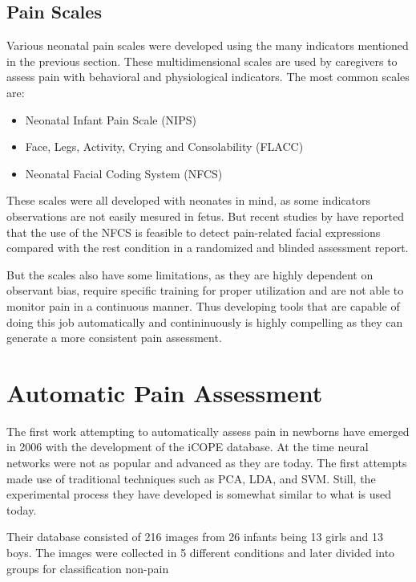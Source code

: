 \subsection{Pain Scales}

Various neonatal pain scales were developed using the many indicators mentioned in the previous section. These multidimensional scales are used by caregivers to assess pain with behavioral and physiological indicators. The most common scales are:

\begin{itemize}
    \item Neonatal Infant Pain Scale (NIPS)
    \item Face, Legs, Activity, Crying and Consolability (FLACC)
    \item Neonatal Facial Coding System (NFCS)
\end{itemize}

These scales were all developed with neonates in mind, as some indicators observations are not easily mesured in fetus. But recent studies by \citeauthor{bernardes2018feasibility} have reported that the use of the NFCS is feasible to detect pain-related facial expressions compared with the rest condition in a randomized and blinded assessment report.

But the scales also have some limitations, as they are highly dependent on observant bias, require specific training for proper utilization and are not able to monitor pain in a continuous manner. Thus developing tools that are capable of doing this job automatically and contininuously is highly compelling as they can generate a more consistent pain assessment.

\section{Automatic Pain Assessment}

The first work attempting to automatically assess pain in newborns have emerged in 2006  with the development of the iCOPE database. At the time neural networks were not as popular and advanced as they are today. The first attempts made use of traditional techniques such as PCA, LDA, and SVM. Still, the experimental process they have developed is somewhat similar to what is used today. 

Their database consisted of 216 images from 26 infants being 13 girls and 13 boys. The images were collected in 5 different conditions and later divided into groups for classification non-pain

